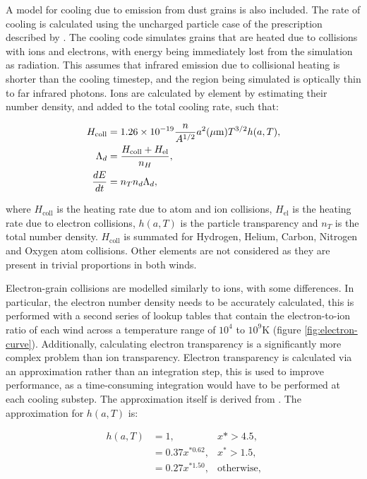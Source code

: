 A model for cooling due to emission from dust grains is also included. The rate of cooling is calculated using the uncharged particle case of the prescription described by \cite{dwek_infrared_1981}. The cooling code simulates grains that are heated due to collisions with ions and electrons, with energy being immediately lost from the simulation as radiation. This assumes that infrared emission due to collisional heating is shorter than the cooling timestep, and the region being simulated is optically thin to far infrared photons. Ions are calculated by element by estimating their number density, and added to the total cooling rate, such that:

\begin{subequations}
  \begin{align}
    H_\text{coll} & = 1.26 \times 10^{-19} \frac{n}{A^{1/2}} a^2(\mu \text m) T^{3/2} h(a,T) , \\
        \Lambda_d & = \frac{H_\text{coll} + H_\text{el}}{n_H} , \\
    \frac{dE}{dt} & = n_T n_d \Lambda_d ,
  \end{align}
\end{subequations}

where $H_\text{coll}$ is the heating rate due to atom and ion collisions, $H_\text{el}$ is the heating rate due to electron collisions, $h(a,T)$ is the particle transparency and $n_T$ is the total number density. $H_\text{coll}$ is summated for Hydrogen, Helium, Carbon, Nitrogen and Oxygen atom collisions. Other elements are not considered as they are present in trivial proportions in both winds.

Electron-grain collisions are modelled similarly to ions, with some differences. In particular, the electron number density needs to be accurately calculated, this is performed with a second series of lookup tables that contain the electron-to-ion ratio of each wind across a temperature range of $10^4$ to $10^9\si{\kelvin}$ (figure \ref{fig:electron-curve}). Additionally, calculating electron transparency is a significantly more complex problem than ion transparency. Electron transparency is calculated via an approximation rather than an integration step, this is used to improve performance, as a time-consuming integration would have to be performed at each cooling substep. The approximation itself is derived from \cite{dwek_infrared_1981}. The approximation for $h(a,T)$ is:

\begin{subequations}
  \begin{align}
    h(a,T) & = 1,              & x* > 4.5 , \\
           & = 0.37x^{*0.62} , & x^* > 1.5 , \\
           & = 0.27x^{*1.50} , & \text{otherwise} ,
  \end{align}
\end{subequations}

